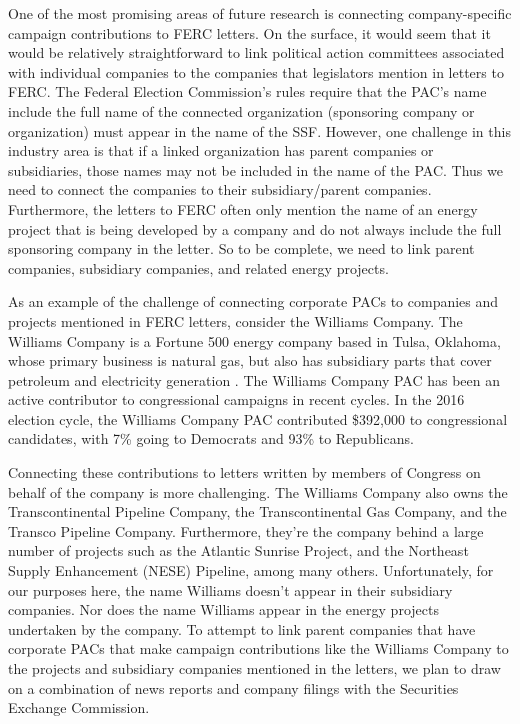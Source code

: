 \documentclass{article}
\begin{document}
One of the most promising areas of future research is connecting company-specific campaign contributions to FERC letters. On the surface, it would seem that it would be relatively straightforward to link political action committees associated with individual companies to the companies that legislators mention in letters to FERC. The Federal Election Commission's rules require that the PAC's name include the full name of the connected organization (sponsoring company or organization) must appear in the name of the SSF. However, one challenge in this industry area is that if a linked organization has parent companies or subsidiaries, those names may not be included in the name of the PAC. Thus we need to connect the companies to their subsidiary/parent companies.  Furthermore, the letters to FERC often only mention the name of an energy project that is being developed by a company and do not always include the full sponsoring company in the letter.  So to be complete, we need to link parent companies, subsidiary companies, and related energy projects.  

As an example of the challenge of connecting corporate PACs to companies and projects mentioned in FERC letters, consider the Williams Company. The Williams Company is a Fortune 500 energy company based in Tulsa, Oklahoma, whose primary business is natural gas, but also has subsidiary parts that cover petroleum and electricity generation \citep{BloombergWilliams2019}.  The Williams Company PAC has been an active contributor to congressional campaigns in recent cycles.  In the 2016 election cycle, the Williams Company PAC contributed \$392,000 to congressional candidates, with 7\% going to Democrats and 93\% to Republicans.  

Connecting these contributions to letters written by members of Congress on behalf of the company is more challenging.  The Williams Company also owns the Transcontinental Pipeline Company, the Transcontinental Gas Company, and the Transco Pipeline Company.  Furthermore, they're the company behind a large number of projects such as the Atlantic Sunrise Project, and the Northeast Supply Enhancement (NESE) Pipeline, among many others. Unfortunately, for our purposes here, the name Williams doesn't appear in their subsidiary companies.  Nor does the name Williams appear in the energy projects undertaken by the company. To attempt to link parent companies that have corporate PACs that make campaign contributions like the Williams Company to the projects and subsidiary companies mentioned in the letters, we plan to draw on a combination of news reports and company filings with the Securities Exchange Commission. %
\end{document}
